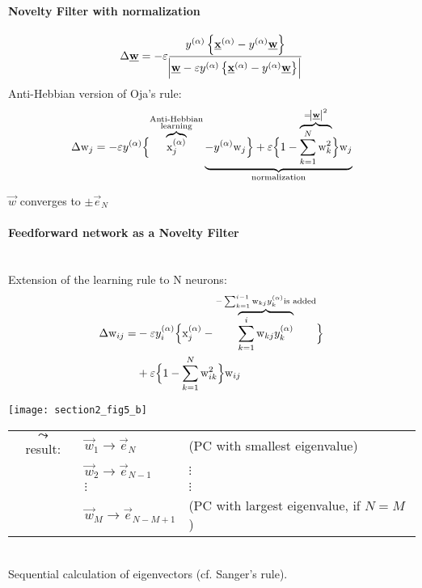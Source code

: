 \paragraph{Novelty Filter with normalization}
\begin{equation*}
		\Delta \underline{\mathbf{w}} = - \varepsilon  \frac{y^{(\alpha)} \left\{ \underline{\mathbf{x}}^{(\alpha)} - y^{(\alpha)} \underline{\mathbf{w}} \right\}}{\abs{\underline{\mathbf{w}} - \varepsilon y^{(\alpha)} \left\{ \underline{\mathbf{x}}^{(\alpha)} - y^{(\alpha)} \underline{\mathbf{w}} \right\}}}
\end{equation*}
Anti-Hebbian version of Oja's rule:\\
\begin{equation*}
			\Delta \mathrm{w}_j = - \varepsilon y^{(\alpha)} \Bigl\{ \overbrace{\mathrm{x}_j^{(\alpha)}}^{\substack{\text{Anti-Hebbian} \\ \text{learning}}} \underbrace{ - y^{(\alpha)} \mathrm{w}_j \Bigr\} + \varepsilon \Bigl\{ 1- \overbrace{\sum_{k=1}^{N} \mathrm{w}_k^2}^{=\abs{\underline{\mathbf{w}}}^2} \Bigr\} \mathrm{w}_j}_{\text{normalization}}
\end{equation*}
\begin{itemize}
		\itl $\vec{w}$ converges to $\pm \vec{e}_N$
\end{itemize}

\paragraph{Feedforward network as a Novelty Filter}\mbox{}\\
Extension of the learning rule to N neurons:\\
\begin{equation*}
				\begin{aligned}
					\Delta \mathrm{w}_{ij} = 
					& - \varepsilon y_i^{(\alpha)} \Bigl\{ \mathrm{x}_j^{(\alpha)} - \overbrace{\sum_{k=1}^{i} \mathrm{w}_{kj} y_k^{(\alpha)}}^{-\sum_{k=1}^{i-1} \mathrm{w}_{kj} y_k^{(\alpha)} \text{is added}} \Bigr\} \\
					& + \varepsilon \Bigl\{ 1- \sum_{k=1}^{N} \mathrm{w}_{ik}^2 \Bigr\} \mathrm{w}_{ij}
				\end{aligned}
\end{equation*}
\begin{center}
\centering
\texttt{[image: section2\_fig5\_b]}
\end{center}
\begin{tabular}{cll}
		$\leadsto$ result: & $\vec{w}_1 \rightarrow \vec{e}_N$ & (PC with smallest eigenvalue) \\ 
		& $\vec{w}_2 \rightarrow \vec{e}_{N-1}$ & $\vdots$ \\ 
		& $\vdots$ & $\vdots$ \\ 
		& $\vec{w}_M \rightarrow \vec{e}_{N-M+1}$ & (PC with largest eigenvalue, if $N=M$) \\ 
	\end{tabular}\\
	\vspace{0.3cm}
	Sequential calculation of eigenvectors (cf. Sanger's rule).

